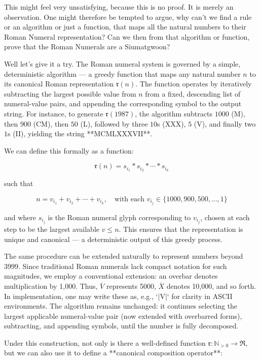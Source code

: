 This might feel very unsatisfying, because this is no proof. It is merely an observation. One might therefore be tempted to argue, why can't we find a rule or an algorithm or just a function, that maps all the natural numbers to their Roman Numeral representation? Can we then from that algorithm or function, prove that the Roman Numerals are a Siumatgwoon?


Well let's give it a try. The Roman numeral system is governed by a simple, deterministic algorithm — a greedy function that maps any natural number $n$ to its canonical Roman representation $\mathfrak{r}(n)$. The function operates by iteratively subtracting the largest possible value from $n$ from a fixed, descending list of numeral-value pairs, and appending the corresponding symbol to the output string. For instance, to generate $\mathfrak{r}(1987)$, the algorithm subtracts $1000$ (M), then $900$ (CM), then $50$ (L), followed by three $10$s (XXX), $5$ (V), and finally two $1$s (II), yielding the string **MCMLXXXVII**.

We can define this formally as a function:

$$
\mathfrak{r}(n) = s_{i_1} * s_{i_2} * \cdots * s_{i_k}
$$

such that

$$
n = v_{i_1} + v_{i_2} + \cdots + v_{i_k}, \quad \text{with each } v_{i_j} \in \{1000, 900, 500, \ldots, 1\}
$$

and where $s_{i_j}$ is the Roman numeral glyph corresponding to $v_{i_j}$, chosen at each step to be the largest available $v \leq n$. This ensures that the representation is unique and canonical — a deterministic output of this greedy process.

The same procedure can be extended naturally to represent numbers beyond 3999. Since traditional Roman numerals lack compact notation for such magnitudes, we employ a conventional extension: an overbar denotes multiplication by 1,000. Thus, $\overline{V}$ represents 5000, $\overline{X}$ denotes 10,000, and so forth. In implementation, one may write these as, e.g., `|V|` for clarity in ASCII environments. The algorithm remains unchanged: it continues selecting the largest applicable numeral-value pair (now extended with overbarred forms), subtracting, and appending symbols, until the number is fully decomposed.

Under this construction, not only is there a well-defined function $\mathfrak{r} : \mathbb{N}_{>0} \rightarrow \mathfrak{R}$, but we can also use it to define a **canonical composition operator**:


